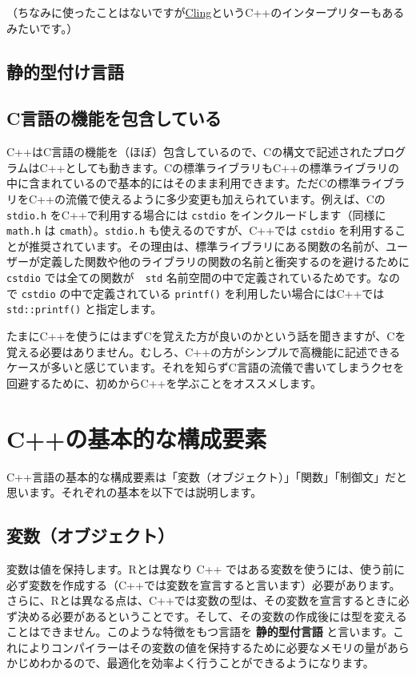 \documentclass[]{book}
\begin{document}
（ちなみに使ったことはないですが\href{https://root.cern.ch/cling}{Cling}というC++のインタープリターもあるみたいです。）

\subsection{静的型付け言語}

\subsection{C言語の機能を包含している}\label{c}

C++はC言語の機能を（ほぼ）包含しているので、Cの構文で記述されたプログラムはC++としても動きます。Cの標準ライブラリもC++の標準ライブラリの中に含まれているので基本的にはそのまま利用できます。ただCの標準ライブラリをC++の流儀で使えるように多少変更も加えられています。例えば、Cの
\texttt{stdio.h} をC++で利用する場合には \texttt{cstdio}
をインクルードします（同様に \texttt{math.h} は
\texttt{cmath}）。\texttt{stdio.h} も使えるのですが、C++では
\texttt{cstdio}
を利用することが推奨されています。その理由は、標準ライブラリにある関数の名前が、ユーザーが定義した関数や他のライブラリの関数の名前と衝突するのを避けるために
\texttt{cstdio} では全ての関数が　\texttt{std}
名前空間の中で定義されているためです。なので \texttt{cstdio}
の中で定義されている \texttt{printf()} を利用したい場合にはC++では
\texttt{std::printf()} と指定します。

たまにC++を使うにはまずCを覚えた方が良いのかという話を聞きますが、Cを覚える必要はありません。むしろ、C++の方がシンプルで高機能に記述できるケースが多いと感じています。それを知らずC言語の流儀で書いてしまうクセを回避するために、初めからC++を学ぶことをオススメします。

\section{C++の基本的な構成要素}\label{c}

C++言語の基本的な構成要素は「変数（オブジェクト）」「関数」「制御文」だと思います。それぞれの基本を以下では説明します。

\subsection{変数（オブジェクト）}

変数は値を保持します。Rとは異なり C++
ではある変数を使うには、使う前に必ず変数を作成する（C++では変数を宣言すると言います）必要があります。さらに、Rとは異なる点は、C++では変数の型は、その変数を宣言するときに必ず決める必要があるということです。そして、その変数の作成後には型を変えることはできません。このような特徴をもつ言語を
\textbf{静的型付言語}
と言います。これによりコンパイラーはその変数の値を保持するために必要なメモリの量があらかじめわかるので、最適化を効率よく行うことができるようになります。
\end{document}
